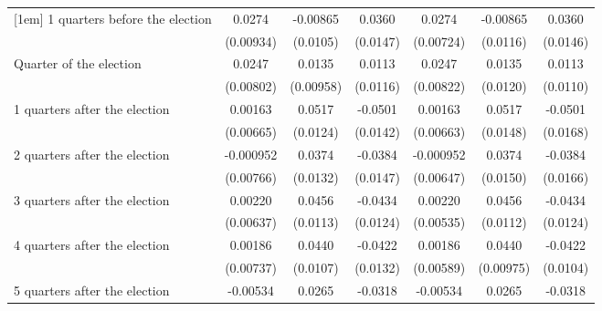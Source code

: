 \begin{table}[htbp]
\begin{tabular}{l*{6}{c}}
[1em]
 1 quarters before the election&      0.0274\sym{**} &    -0.00865         &      0.0360\sym{*}  &      0.0274\sym{***}&    -0.00865         &      0.0360\sym{*}  \\
                    &   (0.00934)         &    (0.0105)         &    (0.0147)         &   (0.00724)         &    (0.0116)         &    (0.0146)         \\
[1em]
Quarter of the election&      0.0247\sym{**} &      0.0135         &      0.0113         &      0.0247\sym{**} &      0.0135         &      0.0113         \\
                    &   (0.00802)         &   (0.00958)         &    (0.0116)         &   (0.00822)         &    (0.0120)         &    (0.0110)         \\
[1em]
 1 quarters after the election&     0.00163         &      0.0517\sym{***}&     -0.0501\sym{***}&     0.00163         &      0.0517\sym{***}&     -0.0501\sym{**} \\
                    &   (0.00665)         &    (0.0124)         &    (0.0142)         &   (0.00663)         &    (0.0148)         &    (0.0168)         \\
[1em]
 2 quarters after the election&   -0.000952         &      0.0374\sym{**} &     -0.0384\sym{**} &   -0.000952         &      0.0374\sym{*}  &     -0.0384\sym{*}  \\
                    &   (0.00766)         &    (0.0132)         &    (0.0147)         &   (0.00647)         &    (0.0150)         &    (0.0166)         \\
[1em]
 3 quarters after the election&     0.00220         &      0.0456\sym{***}&     -0.0434\sym{***}&     0.00220         &      0.0456\sym{***}&     -0.0434\sym{***}\\
                    &   (0.00637)         &    (0.0113)         &    (0.0124)         &   (0.00535)         &    (0.0112)         &    (0.0124)         \\
[1em]
 4 quarters after the election&     0.00186         &      0.0440\sym{***}&     -0.0422\sym{**} &     0.00186         &      0.0440\sym{***}&     -0.0422\sym{***}\\
                    &   (0.00737)         &    (0.0107)         &    (0.0132)         &   (0.00589)         &   (0.00975)         &    (0.0104)         \\
[1em]
 5 quarters after the election&    -0.00534         &      0.0265\sym{**} &     -0.0318\sym{**} &    -0.00534         &      0.0265\sym{*}  &     -0.0318\sym{**} \\

\end{tabular}
\end{table}

